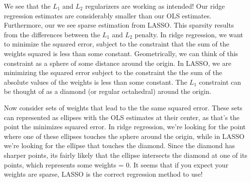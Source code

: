 \documentclass[10pt]{article}
\begin{document}
We see that the $L_1$ and $L_2$ regularizers are working as intended! Our ridge regression estimates are considerably smaller than our OLS estimates. Furthermore, our we see sparse estimation from LASSO. This sparsity results from the differences between the $L_1$ and $L_2$ penalty. In ridge regression, we want to minimize the squared error, subject to the constraint that the sum of the weights squared is less than some constant. Geometrically, we can think of this constraint as a sphere of some distance around the origin. In LASSO, we are minimizing the squared error subject to the constraint the the sum of the absolute values of the weights is less than some constant. The $L_1$ constraint can be thought of as a diamond (or regular octahedral) around the origin.

Now consider sets of weights that lead to the the same squared error. These sets can represented as ellipses with the OLS estimates at their center, as that's the point the minimizes squared error. In ridge regression, we're looking for the point where one of these ellipses touches the sphere around the origin, while in LASSO we're looking for the ellipse that touches the diamond. Since the diamond has sharper points, its fairly likely that the ellipse intersects the diamond at one of its points, which represents some weights = 0. It seems that if you expect your weights are sparse, LASSO is the correct regression method to use!

	
\end{document}

